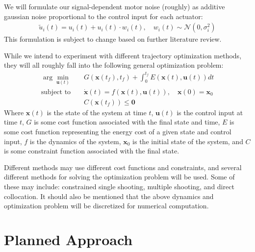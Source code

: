 \documentclass[table,12pt]{article}
\begin{document}
We will formulate our signal-dependent motor noise (roughly) as additive gaussian noise proportional to the control input for each actuator:
\begin{align}
    \tilde{u}_i(t) = u_i(t) + u_i(t) \cdot w_i(t), \quad w_i(t) \sim \mathcal{N}(0, \sigma_i^2)
\end{align}
This formulation is subject to change based on further literature review.

While we intend to experiment with different trajectory optimization methods, they will all roughly fall into the following general optimization problem:
\begin{align}
    \arg\min_{\mathbf{u}(t)} &\quad G\left(\mathbf{x}(t_f), t_f\right) + \int_0^{t_f} E(\mathbf{x}(t), \mathbf{u}(t)) dt \\
    \text{subject to} &\quad \dot{\mathbf{x}}(t) = f(\mathbf{x}(t), \mathbf{u}(t)), \quad \mathbf{x}(0) = \mathbf{x}_0 \\
    &\quad C(\mathbf{x}(t_f)) \leq \mathbf{0}
\end{align}
Where $\mathbf{x}(t)$ is the state of the system at time $t$, $\mathbf{u}(t)$ is the control input at time $t$, $G$ is some cost function associated with the final state and time, $E$ is some cost function representing the energy cost of a given state and control input, $f$ is the dynamics of the system, $\mathbf{x}_0$ is the initial state of the system, and $C$ is some constraint function associated with the final state.

Different methods may use different cost functions and constraints, and several different methods for solving the optimization problem will be used. Some of these may include: constrained single shooting, multiple shooting, and direct collocation. It should also be mentioned that the above dynamics and optimization problem will be discretized for numerical computation.

\section{Planned Approach}
\end{document}
